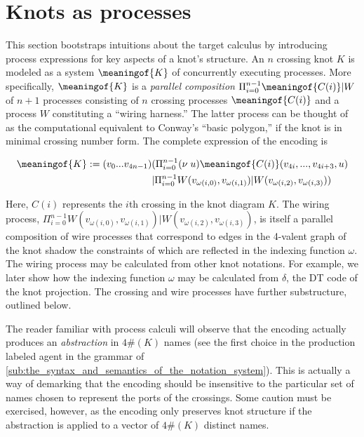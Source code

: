 \section{Knots as processes}\label{sec:knots_as_processes} %

This section bootstraps intuitions about the target calculus by
introducing process expressions for key aspects of a knot's
structure. An $n$ crossing knot $K$ is modeled as a system
$\meaningof{K}$ of concurrently executing processes. More
specifically, $\meaningof{K}$ is a \emph{parallel composition} $\Pi_{i
  = 0}^{n-1} \meaningof{C(i)} | W$ of $n+1$ processes consisting of
$n$ crossing processes $\meaningof{C(i)}$ and a process $W$
constituting a ``wiring harness.'' The latter process can be thought
of as the computational equivalent to Conway's ``basic polygon,'' if
the knot is in minimal crossing number form. The complete expression
of the encoding is


\begin{align*}
  \meaningof{K} :=  (v_0 ... v_{4n-1}) & ( \Pi_{i = 0}^{n-1} (\nu \; u)\meaningof{C(i)}(v_{4i},...,v_{4i+3},u) \\
  & | \Pi_{i = 0}^{n-1} W(v_{\omega(i,0)},v_{\omega(i,1)})|W(v_{\omega(i,2)},v_{\omega(i,3)}) )
\end{align*}

Here, $C(i)$ represents the $i$th crossing in the knot diagram $K$.  The wiring process, $\Pi_{i =
  0}^{n-1}W(v_{\omega(i,0)},v_{\omega(i,1)})|W(v_{\omega(i,2)},v_{\omega(i,3)})$,
is itself a parallel composition of wire processes that correspond to
edges in the 4-valent graph of the knot shadow \cite{SchareinPhD} the constraints of
which are reflected in the indexing function $\omega$. The wiring process
may be calculated from other knot notations. For example,  we later show how the indexing function $\omega$ may be calculated
from $\delta$, the DT code of the knot projection. The crossing and wire
processes have further substructure, outlined below.

\begin{remark}
  The reader familiar with process calculi will observe that the
  encoding actually produces an \emph{abstraction} \cite{SangiorgiWalker}  in $4\#(K)$ names
  (see the first choice in the production labeled agent in the grammar
  of \ref{sub:the_syntax_and_semantics_of_the_notation_system}). This is actually a way of demarking that the encoding should
  be insensitive to the particular set of names chosen to represent the
  ports of the crossings. Some caution must be exercised, however, as
  the encoding only preserves knot structure if the abstraction is
  applied to a vector of $4\#(K)$ distinct names.
\end{remark}

